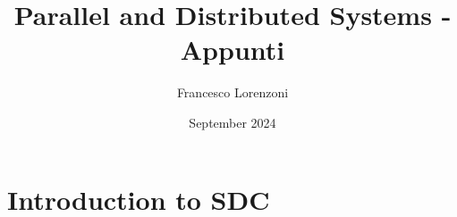 

\title{Parallel and Distributed Systems - Appunti}
\author{Francesco Lorenzoni}
\date{September 2024}


\makeatletter
\renewcommand{\l@section}{\@dottedtocline{1}{1.5em}{2.6em}}
\renewcommand{\l@subsection}{\@dottedtocline{2}{2.5em}{3.6em}}
\renewcommand{\l@subsubsection}{\@dottedtocline{3}{3.5em}{4.5em}}
\makeatother
{} %



\doparttoc[n]

\maketitle
\tableofcontents

\part{Introduction to SDC}
\parttoc








